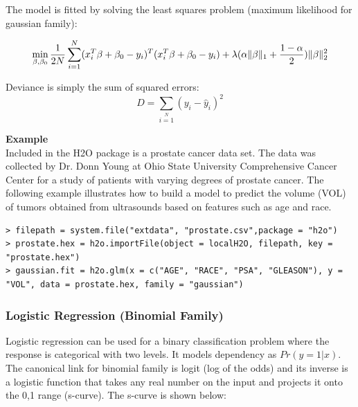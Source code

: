\documentclass{article}[11pt]
\begin{document}
The model is fitted by solving the least squares problem (maximum likelihood for gaussian family):

\[ \min\limits_{\beta,\beta_0} { {1 \over 2N}\sum\limits_{i=1}\limits^{N}(x_i^{T}\beta  + \beta_0- y_i)^T (x_i^{T}\beta + \beta_0 - y_i)  + \lambda (\alpha \|\beta \|_1 + {1-\alpha \over 2}) \| \beta \|_2^2} \]


Deviance is simply the sum of squared errors:
\[ D = \sum\limits_{i=1}\limits^{N}{(y_i - \hat{y}_i)^2} \]


\textbf{Example}\\

Included in the H2O package is a prostate cancer data set. The data was collected by Dr. Donn Young at  Ohio State University Comprehensive Cancer Center for a study of patients with varying degrees of prostate cancer. The following example illustrates how to build a model to predict the volume (VOL) of tumors obtained from ultrasounds based on features such as age and race.

\begin{lstlisting}[breaklines,basicstyle=\ttfamily]
> filepath = system.file("extdata", "prostate.csv",package = "h2o")
> prostate.hex = h2o.importFile(object = localH2O, filepath, key = "prostate.hex")
> gaussian.fit = h2o.glm(x = c("AGE", "RACE", "PSA", "GLEASON"), y = "VOL", data = prostate.hex, family = "gaussian")
\end{lstlisting}

\subsubsection{Logistic Regression (Binomial Family)}
Logistic regression can be used for a binary classification problem where the response is categorical with two levels. It models dependency as $Pr(y = 1|x)$. The canonical link for binomial family is logit (log of the odds) and its inverse is a logistic function that takes any real number on the input and projects it onto the 0,1 range (s-curve).  The s-curve is shown below: 
\end{document}
